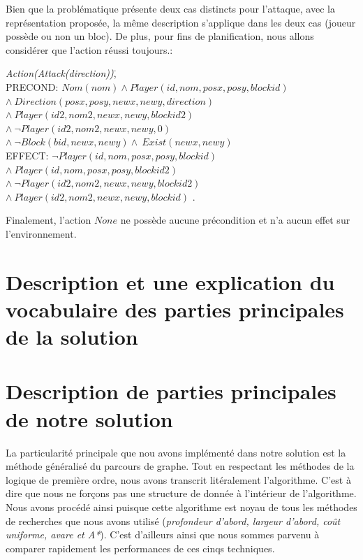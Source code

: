 \documentclass[12pt,english,frenchb,letterpaper]{article}
\begin{document}
Bien que la problématique présente deux cas distincts pour l'attaque, avec la représentation proposée, la même description s'applique dans les deux cas (joueur possède ou non un bloc).  De plus, pour fins de planification, nous allons considérer que l'action réussi toujours.:

\begin{tabbing}
\textit{Action}\=\textit{(Attack(direction))}\=,\\
\> PRECOND: \> $Nom(nom) \wedge Player(id,nom,posx,posy,blockid)$ \\ 
\> \> $  \wedge \ Direction(posx,posy,newx,newy,direction) $ \\
\> \> $  \wedge \ Player(id2,nom2,newx,newy,blockid2) $ \\
\> \> $  \wedge \ \lnot Player(id2,nom2,newx,newy,0) $ \\
\> \> $ \wedge\ \lnot Block(bid,newx,newy) \wedge \ Exist(newx,newy)$ \\               
\> EFFECT: \>$ \lnot Player(id,nom,posx,posy,blockid) $ \\
\>  \> $\wedge\ Player(id,nom,posx,posy,blockid2)$ \\
\>  \> $\wedge\ \lnot Player(id2,nom2,newx,newy,blockid2)$ \\
\>  \> $\wedge\ Player(id2,nom2,newx,newy,blockid)$ .\\
\end{tabbing}

Finalement, l'action $None$ ne possède aucune précondition et n'a aucun effet sur l'environnement.

\section{Description et une explication du vocabulaire des parties principales de la solution}

\section{Description de parties principales de notre solution}
La particularité principale que nou avons implémenté dans notre solution est la méthode généralisé du parcours de graphe. Tout en respectant les méthodes de la logique de première ordre, nous avons transcrit litéralement l'algorithme. C'est à dire que nous ne forçons pas une structure de donnée à l'intérieur de l'algorithme. Nous avons procédé ainsi puisque cette algorithme est noyau de tous les méthodes de recherches que nous avons utilisé (\textit{profondeur d'abord, largeur d'abord, coût uniforme, avare et A*}). C'est d'ailleurs ainsi que nous sommes parvenu à comparer rapidement les performances de ces cinqs techniques.
\end{document}
